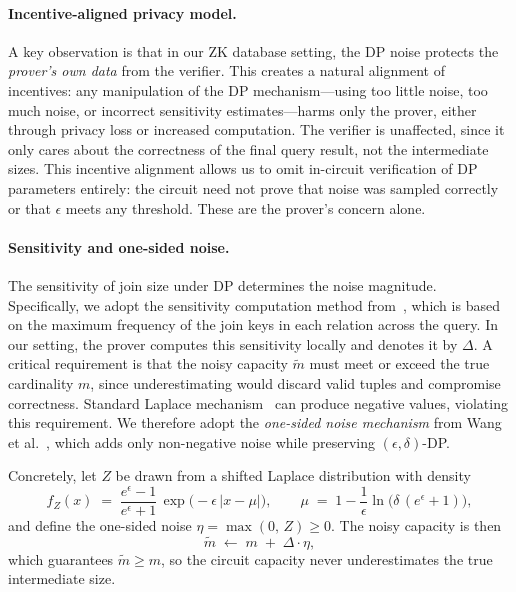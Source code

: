 \documentclass[sigconf]{acmart}
\renewcommand{\emph}[1]{\textit{#1}}
\begin{document}
\vspace{-0.1in}
\paragraph{Incentive-aligned privacy model.}
A key observation is that in our ZK database setting, the DP noise protects the \emph{prover's own data} from the verifier. This creates a natural alignment of incentives: any manipulation of the DP mechanism---using too little noise, too much noise, or incorrect sensitivity estimates---harms only the prover, either through privacy loss or increased computation. The verifier is unaffected, since it only cares about the correctness of the final query result, not the intermediate sizes. This incentive alignment allows us to omit in-circuit verification of DP parameters entirely: the circuit need not prove that noise was sampled correctly or that $\epsilon$ meets any threshold. These are the prover's concern alone.

\vspace{-0.1in}
\paragraph{Sensitivity and one-sided noise.}
The sensitivity of join size under DP determines the noise magnitude.
Specifically, we adopt the sensitivity computation method from~\cite{dong2024continual},
which is based on the maximum frequency of the join keys in each relation across the query.
In our setting, the prover computes this sensitivity locally and denotes it by $\Delta$.
A critical requirement is that the noisy capacity $\widetilde{m}$ must meet or exceed the true
cardinality $m$, since underestimating would discard valid tuples and compromise correctness.
Standard Laplace mechanism~\cite{dwork2014algorithmic} can produce negative values, violating
this requirement. We therefore adopt the \emph{one-sided noise mechanism} from Wang et al.~\cite{wang2024special},
which adds only non-negative noise while preserving $(\epsilon,\delta)$-DP.

Concretely, let $Z$ be drawn from a shifted Laplace distribution with density
\vspace{-0.1in}
\begin{equation}
f_Z(x) \;=\; \frac{e^{\epsilon}-1}{e^{\epsilon}+1}\,\exp\!\bigl(-\epsilon\,\lvert x-\mu\rvert\bigr),
\qquad
\mu \;=\; 1 - \frac{1}{\epsilon}\ln\!\bigl(\delta\,(e^{\epsilon}+1)\bigr),
\label{eq:one_sided_pdf}
\end{equation}
and define the one-sided noise $\eta = \max(0,\,Z) \ge 0$.
The noisy capacity is then
\vspace{-0.1in}
\begin{equation}
\widetilde{m} \;\leftarrow\; m \;+\; \Delta \cdot \eta,
\label{eq:one_sided_cap}
\end{equation}
which guarantees $\widetilde{m}\ge m$, so the circuit capacity never underestimates the true intermediate size.
\end{document}
